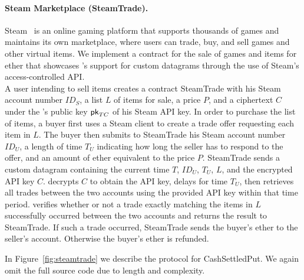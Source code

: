\paragraph{Steam Marketplace ({\sf SteamTrade}).} Steam~\cite{steam} is an online gaming platform that supports thousands of games and maintains its own marketplace, where users can trade, buy, and sell games and other virtual items.  We implement a contract for the sale of games and items for ether that showcases \tc's support for custom datagrams through the use of Steam's access-controlled API.\\
\indent A user intending to sell items creates a contract {\sf SteamTrade} with his Steam account number $ID_S$, a list $L$ of items for sale, a price $P$, and a ciphertext $C$ under the \tc's public key ${\sf pk}_{TC}$ of his Steam API key.  In order to purchase the list of items, a buyer first uses a Steam client to create a trade offer requesting each item in $L$.  The buyer then submits to {\sf SteamTrade} his Steam account number $ID_U$, a length of time $T_U$ indicating how long the seller has to respond to the offer, and an amount of ether equivalent to the price $P$.  {\sf SteamTrade} sends \tc a custom datagram containing the current time $T$, $ID_U$, $T_U$, $L$, and the encrypted API key $C$.  \tc decrypts $C$ to obtain the API key, delays for time $T_U$, then retrieves all trades between the two accounts using the provided API key within that time period.  \tc verifies whether or not a trade exactly matching the items in $L$ successfully occurred between the two accounts and returns the result to {\sf SteamTrade}.  If such a trade occurred, {\sf SteamTrade} sends the buyer's ether to the seller's account.  Otherwise the buyer's ether is refunded.

In Figure~\ref{fig:steamtrade} we describe the protocol for {\sf CashSettledPut}.
We again omit the full source code due to length and complexity.

